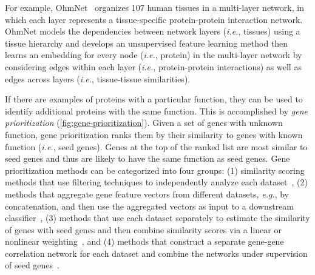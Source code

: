 \documentclass[5p]{elsarticle}
\newcommand{\eg}{\emph{e.g.}\xspace}
\newcommand{\ie}{\emph{i.e.}\xspace}
\newcommand{\rev}[1]{{\color{black}#1}}
\begin{document}
For example, OhmNet~\cite{Zitnik2017ohmnet} organizes 107 human tissues in a multi-layer network, in which each layer represents a tissue-specific protein-protein interaction network.
OhmNet models the dependencies between network layers (\ie, tissues) using a tissue hierarchy and develops an unsupervised feature learning method then learns an embedding for every node (\ie, protein) in the multi-layer network by considering \rev{edges within each layer (\ie, pro\-tein-protein interactions) as well as edges across layers (\ie, tissue-tissue similarities)}.

If there are examples of proteins with a particular function, they can be used to identify additional proteins with the same function.
This is accomplished by {\em gene prioritization} (\autoref{fig:gene-prioritization}).
Given a set of genes with unknown function, gene prioritization ranks them by their similarity to genes with known function (\ie, seed genes).
Genes at the top of the ranked list are most similar to seed genes and thus are likely to have the same function as seed genes.
Gene prioritization methods can be categorized into four groups: (1) similarity scoring methods that use filtering techniques to independently analyze each dataset~\cite{Franke2004team}, (2) methods that aggregate gene feature vectors from different datasets, \eg, by concatenation, and then use the aggregated vectors as input to a downstream classifier~\cite{Sifrim2013extasy}, (3) methods that use each dataset separately to estimate the similarity of genes with seed genes and then combine similarity scores via a linear or nonlinear weighting~\cite{Lanckriet2004statistical,Aerts2006gene,Tranchevent2016candidate}, and (4) methods that construct a separate gene-gene correlation network for each dataset and combine the networks under supervision of seed genes~\cite{Kohler2008walking,Mostafavi2008genemania}.
\end{document}
